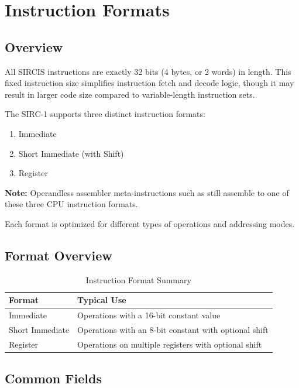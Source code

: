 \chapter{Instruction Formats}
\label{ch:instruction-formats}

\section{Overview}

All SIRCIS instructions are exactly 32 bits (4 bytes, or 2 words) in length. This fixed instruction size simplifies
instruction fetch and decode logic, though it may result in larger code size compared to variable-length instruction
sets.

The SIRC-1 supports three distinct instruction formats:

\begin{enumerate}
	\item Immediate
	\item Short Immediate (with Shift)
	\item Register
\end{enumerate}

\textbf{Note:} Operandless assembler meta-instructions such as  still assemble to one of these three CPU
instruction formats.

Each format is optimized for different types of operations and addressing modes.

\section{Format Overview}

\begin{table}[H]
	\centering
	\small
	\begin{tabular}{lp{9cm}}
		\toprule
		\textbf{Format} & \textbf{Typical Use}                                  \\
		\midrule
		Immediate       & Operations with a 16-bit constant value               \\
		Short Immediate & Operations with an 8-bit constant with optional shift \\
		Register        & Operations on multiple registers with optional shift  \\
		\bottomrule
	\end{tabular}
	\caption{Instruction Format Summary}
	\label{tab:format-summary}
\end{table}

\section{Common Fields}


